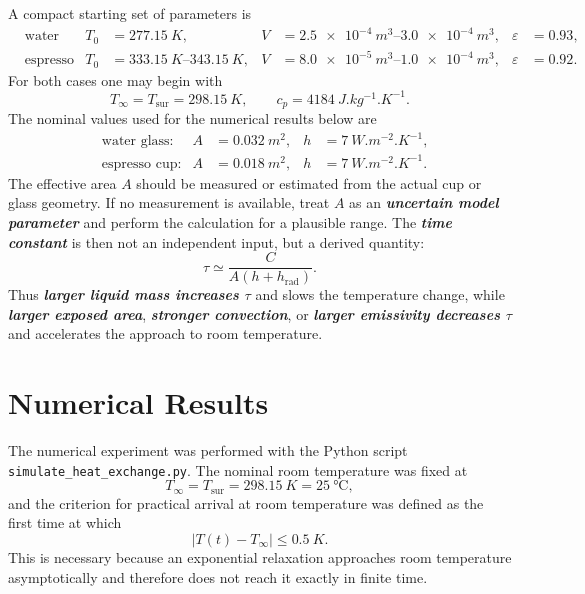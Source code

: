 \documentclass[11pt]{article}
\begin{document}
A compact starting set of parameters is
\begin{align}
    &\text{water glass:} & T_0 &= \SI{277.15}{K}, & V &= \SIrange{2.5e-4}{3.0e-4}{m^3}, & \varepsilon &= 0.93, \\
    &\text{espresso cup:} & T_0 &= \SIrange{333.15}{343.15}{K}, & V &= \SIrange{8.0e-5}{1.0e-4}{m^3}, & \varepsilon &= 0.92.
\end{align}
For both cases one may begin with
\begin{equation}
    T_{\infty}=T_{\mathrm{sur}}=\SI{298.15}{K},
    \qquad
    c_p=\SI{4184}{J.kg^{-1}.K^{-1}}.
\end{equation}
The nominal values used for the numerical results below are
\begin{align}
    &\text{water glass:} & A &= \SI{0.032}{m^2}, & h &= \SI{7}{W.m^{-2}.K^{-1}}, \\
    &\text{espresso cup:} & A &= \SI{0.018}{m^2}, & h &= \SI{7}{W.m^{-2}.K^{-1}}.
\end{align}
The effective area $A$ should be measured or estimated from the actual cup or glass geometry. If no measurement is available, treat $A$ as an \textbf{\textit{uncertain model parameter}} and perform the calculation for a plausible range. The \textbf{\textit{time constant}} is then not an independent input, but a derived quantity:
\begin{equation}
    \tau \simeq \frac{C}{A\left(h+h_{\mathrm{rad}}\right)}.
\end{equation}
Thus \textbf{\textit{larger liquid mass increases $\tau$}} and slows the temperature change, while \textbf{\textit{larger exposed area}}, \textbf{\textit{stronger convection}}, or \textbf{\textit{larger emissivity decreases $\tau$}} and accelerates the approach to room temperature.

\section{Numerical Results}

The numerical experiment was performed with the Python script \texttt{simulate\_heat\_exchange.py}. The nominal room temperature was fixed at
\begin{equation}
    T_{\infty}=T_{\mathrm{sur}}=\SI{298.15}{K}=\SI{25}{\degreeCelsius},
\end{equation}
and the criterion for practical arrival at room temperature was defined as the first time at which
\begin{equation}
    |T(t)-T_{\infty}|\leq \SI{0.5}{K}.
\end{equation}
This is necessary because an exponential relaxation approaches room temperature asymptotically and therefore does not reach it exactly in finite time.
\end{document}
